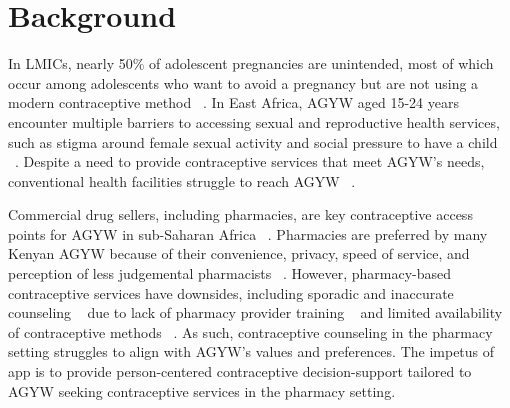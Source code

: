 \section{Background}

In LMICs, nearly 50\% of adolescent pregnancies are unintended, most of which occur among adolescents who want to avoid a pregnancy but are not using a modern contraceptive method ~\cite{sully2020adding}. In East Africa, AGYW aged 15-24 years encounter multiple barriers to accessing sexual and reproductive health services, such as stigma around female sexual activity and social pressure to have a child ~\cite{sully2020adding}. Despite a need to provide contraceptive services that meet AGYW’s needs, conventional health facilities struggle to reach AGYW  ~\cite{corroon2016key}.

Commercial drug sellers, including pharmacies, are key contraceptive access points for AGYW in sub-Saharan Africa ~\cite{gonsalves2023pharmacies, gonsalves2020mixed, radovich2018meets}. Pharmacies are preferred by many Kenyan AGYW because of their convenience, privacy, speed of service, and perception of less judgemental pharmacists ~\cite{gonsalves2023pharmacies, gonsalves2020mixed}. However, pharmacy-based contraceptive services have downsides, including sporadic and inaccurate counseling ~\cite{gonsalves2020pharmacists} due to lack of pharmacy provider training ~\cite{gonsalves2019regulating} and limited availability of contraceptive methods ~\cite{gonsalves2023pharmacies}. As such, contraceptive counseling in the pharmacy setting struggles to align with AGYW’s values and preferences. The impetus of  app is to provide person-centered contraceptive decision-support tailored to AGYW seeking contraceptive services in the pharmacy setting.
